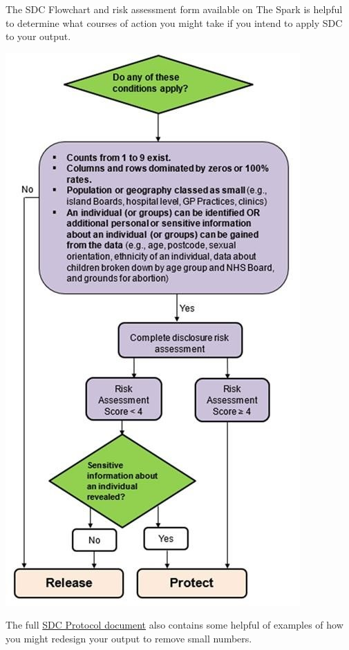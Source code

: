 \documentclass[
]{book}
\begin{document}
The SDC Flowchart and risk assessment form available on The Spark is helpful to determine what courses of action you might take if you intend to apply SDC to your output.

\includegraphics[width=1\linewidth]{imgs/sdc-flowchart}

The full \href{https://spark.publichealthscotland.org/corporate-guidance/statistical-governance/statistical-disclosure-control/overview-of-disclosure-control-protocol/}{SDC Protocol document} also contains some helpful of examples of how you might redesign your output to remove small numbers.
\end{document}

